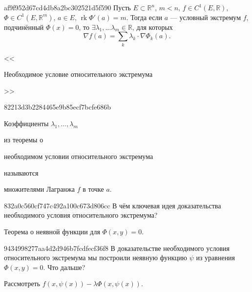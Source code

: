 \begin{note}{af9f952d67cd4db8a2bc302521d5f590}
    Пусть \({ E \subset \mathbb R^{n} }\), \({ m < n }\), \({ f \in C^{1}(E, \mathbb R) }\), \({ \Phi \in C^{1}(E, \mathbb R^{m}) }\), \({ a \in E }\), \({ \operatorname{rk} \Phi'(a) = m }\).
    Тогда если \({ a }\) --- условный экстремум \({ f }\), подчинённый \({ \Phi(x) = 0 }\), то \({ \exists \lambda_1, \ldots \lambda_m \in \mathbb R }\), для которых
    \[
        \nabla f(a) = \sum_{k} \lambda_k \cdot \nabla \Phi_k(a).
    \]

    \begin{center}
        \tiny
        <<\begin{icloze}{1}Необходимое условие относительного экстремума\end{icloze}>>
    \end{center}
\end{note}

\begin{note}{82213d3b2284465e9b85ecf7bcfe686b}
    \begin{icloze}{2}Коэффициенты \({ \lambda_1, \ldots, \lambda_m }\)\end{icloze} из теоремы о \begin{icloze}{3}необходимом условии относительного экстремума\end{icloze} называются \begin{icloze}{1}множителями Лагранжа \({ f }\) в точке \({ a }\).\end{icloze}
\end{note}

\begin{note}{832a0c560cf747c492a100c673d806cc}
    В чём ключевая идея доказательства необходимого условия относительного экстремума?

    \begin{cloze}{1}
        Теорема о неявной функции для \({ \Phi(x, y) = 0 }\).
    \end{cloze}
\end{note}

\begin{note}{9434998277aa4d2d946b7fcdfecf36f8}
    В доказательстве необходимого условия относительного экстремума мы построили неявную функцию \({ \psi }\) из уравнения \({ \Phi(x, y) = 0 }\).
    Что дальше?

    \begin{cloze}{1}
        Рассмотреть \({ f(x, \psi(x)) - \lambda \Phi(x, \psi(x)) }\).
    \end{cloze}
\end{note}


